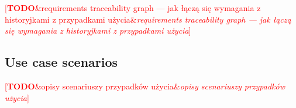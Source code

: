 \documentclass[english,engineering]{wizthesis}
\newcommand{\todo}[1]{%
  \textcolor{red}{[\textbf{TODO}\ifx&#1&{}\else{ }\fi\emph{#1}]}%
}
\begin{document}
\todo{requirements traceability graph --- jak łączą się wymagania z historyjkami
z przypadkami użycia}







\subsection{Use case scenarios}

\todo{opisy scenariuszy przypadków użycia}
\end{document}

